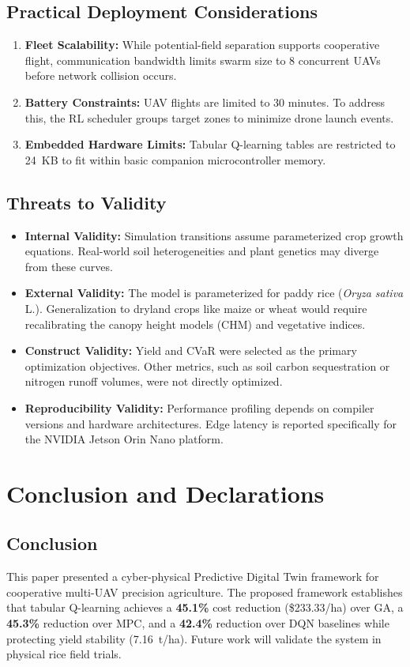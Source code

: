 \documentclass[review,3p,times,authoryear]{elsarticle}
\begin{document}
\subsection{Practical Deployment Considerations}
\begin{enumerate}
    \item \textbf{Fleet Scalability:} While potential-field separation supports cooperative flight, communication bandwidth limits swarm size to 8 concurrent UAVs before network collision occurs.
    \item \textbf{Battery Constraints:} UAV flights are limited to 30 minutes. To address this, the RL scheduler groups target zones to minimize drone launch events.
    \item \textbf{Embedded Hardware Limits:} Tabular Q-learning tables are restricted to 24~KB to fit within basic companion microcontroller memory.
\end{enumerate}

\subsection{Threats to Validity}
\begin{itemize}
    \item \textbf{Internal Validity:} Simulation transitions assume parameterized crop growth equations. Real-world soil heterogeneities and plant genetics may diverge from these curves.
    \item \textbf{External Validity:} The model is parameterized for paddy rice (\textit{Oryza sativa} L.). Generalization to dryland crops like maize or wheat would require recalibrating the canopy height models (CHM) and vegetative indices.
    \item \textbf{Construct Validity:} Yield and CVaR were selected as the primary optimization objectives. Other metrics, such as soil carbon sequestration or nitrogen runoff volumes, were not directly optimized.
    \item \textbf{Reproducibility Validity:} Performance profiling depends on compiler versions and hardware architectures. Edge latency is reported specifically for the NVIDIA Jetson Orin Nano platform.
\end{itemize}

\section{Conclusion and Declarations}

\subsection{Conclusion}
This paper presented a cyber-physical Predictive Digital Twin framework for cooperative multi-UAV precision agriculture. The proposed framework establishes that tabular Q-learning achieves a \textbf{45.1\%} cost reduction (\$233.33/ha) over GA, a \textbf{45.3\%} reduction over MPC, and a \textbf{42.4\%} reduction over DQN baselines while protecting yield stability (7.16~t/ha). Future work will validate the system in physical rice field trials.
\end{document}
